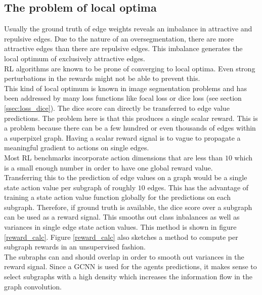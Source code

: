 \subsection{The problem of local optima}
Usually the ground truth of edge weights reveals an imbalance in attractive and repulsive edges. Due to the nature of an oversegmentation, there are more attractive edges than there are repulsive edges. This imbalance generates the local optimum of exclusively attractive edges.\\
RL algorithms are known to be prone of converging to local optima. Even strong perturbations in the rewards might not be able to prevent this.\\
This kind of local optimum is known in image segmentation problems and has been addressed by many loss functions like focal loss \cite{lin2017focal} or dice loss (see section \ref{ssec:loss_dice}). The dice score can directly be transferred to edge value predictions. The problem here is that this produces a single scalar reward. This is a problem because there can be a few hundred or even thousands of edges within a superpixel graph. Having a scalar reward signal is to vague to propagate a meaningful gradient to actions on single edges.\\
Most RL benchmarks incorporate action dimensions that are less than $10$ which is a small enough number in order to have one global reward value.\\
Transferring this to the prediction of edge values on a graph would be a single state action value per subgraph of roughly $10$ edges. This has the advantage of training a state action value function globally for the predictions on each subgraph. Therefore, if ground truth is available, the dice score over a subgraph can be used as a reward signal. This smooths out class inbalances as well as variances in single edge state action values. This method is shown in figure \ref{reward_calc}. Figure \ref{reward_calc} also sketches a method to compute per subgraph rewards in an unsupervised fashion.\\
The subraphs can and should overlap in order to smooth out variances in the reward signal. Since a GCNN is used for the agents predictions, it makes sense to select subgraphs with a high density which increases the information flow in the graph convolution.

